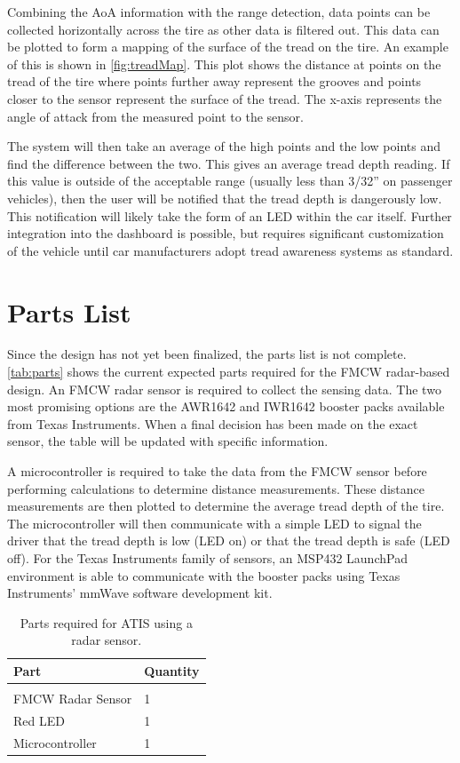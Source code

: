 \documentclass[11pt]{IEEEtran}
\begin{document}
		Combining the AoA information with the range detection, data points can be collected horizontally across the tire as other data is filtered out. This data can be plotted to form a mapping of the surface of the tread on the tire. An example of this is shown in \autoref{fig:treadMap}. This plot shows the distance at points on the tread of the tire where points further away represent the grooves and points closer to the sensor represent the surface of the tread. The x-axis represents the angle of attack from the measured point to the sensor. 

		The system will then take an average of the high points and the low points and find the difference between the two. This gives an average tread depth reading. If this value is outside of the acceptable range (usually less than 3/32'' on passenger vehicles), then the user will be notified that the tread depth is dangerously low. This notification will likely take the form of an LED within the car itself. Further integration into the dashboard is possible, but requires significant customization of the vehicle until car manufacturers adopt tread awareness systems as standard.


	\section{Parts List}
		Since the design has not yet been finalized, the parts list is not complete. \autoref{tab:parts} shows the current expected parts required for the FMCW radar-based design. An FMCW radar sensor is required to collect the sensing data. The two most promising options are the AWR1642 \cite{AWR1642} and IWR1642 \cite{IWR1642} booster packs available from Texas Instruments. When a final decision has been made on the exact sensor, the table will be updated with specific information.

		A microcontroller is required to take the data from the FMCW sensor before performing calculations to determine distance measurements. These distance measurements are then plotted to determine the average tread depth of the tire. The microcontroller will then communicate with a simple LED to signal the driver that the tread depth is low (LED on) or that the tread depth is safe (LED off). For the Texas Instruments family of sensors, an MSP432 LaunchPad environment is able to communicate with the booster packs using Texas Instruments' mmWave software development kit.

		\begin{table}[t]
			\begin{center}
				\caption{Parts required for ATIS using a radar sensor.}
				\label{tab:parts}
				\begin{tabular}{l|l}
					Part 			& Quantity  \\
					\hline
					\vspace{-0.1in}		&	\\
					FMCW Radar Sensor 	& 1 \\
					Red LED 			& 1 \\
					Microcontroller		& 1 
				\end{tabular}
			\end{center}
		\end{table}
\end{document}
